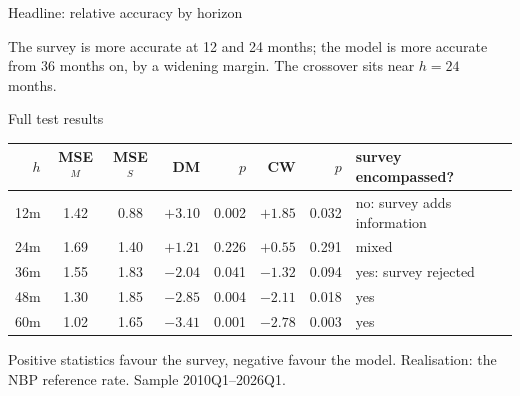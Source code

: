 \documentclass[aspectratio=169,11pt]{beamer}
\begin{document}
\begin{frame}{Headline: relative accuracy by horizon}
  \begin{center}
  \end{center}
  \footnotesize\color{ycmuted} The survey is more accurate at 12 and 24
  months; the model is more accurate from 36 months on, by a widening margin.
  The crossover sits near $h=24$ months.
\end{frame}

\begin{frame}{Full test results}
  \begin{center}
  \small
  \begin{tabular}{rccrrrrl}
    $h$ & MSE$^{M}$ & MSE$^{S}$ & DM & $p$ & CW & $p$ & survey encompassed?\\
    \hline
    12m & 1.42 & 0.88 & $+3.10$ & 0.002 & $+1.85$ & 0.032 & no: survey adds information\\
    24m & 1.69 & 1.40 & $+1.21$ & 0.226 & $+0.55$ & 0.291 & mixed\\
    36m & 1.55 & 1.83 & $-2.04$ & 0.041 & $-1.32$ & 0.094 & yes: survey rejected\\
    48m & 1.30 & 1.85 & $-2.85$ & 0.004 & $-2.11$ & 0.018 & yes\\
    60m & 1.02 & 1.65 & $-3.41$ & 0.001 & $-2.78$ & 0.003 & yes\\
  \end{tabular}
  \end{center}
  \vspace{2mm}
  \footnotesize\color{ycmuted} Positive statistics favour the survey, negative
  favour the model. Realisation: the NBP reference rate. Sample
  2010Q1--2026Q1.
\end{frame}
\end{document}
